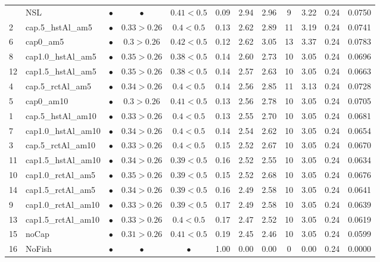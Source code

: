\documentclass[11pt]{book}
\begin{document}
\begin{landscape}
\begin{longtable}[t]{llcccccccccc}
\midrule
\endhead
\
\endfoot
\bottomrule
\endlastfoot
17 & NSL & $\bullet$ & $\bullet$ & $0.41<0.5$ & 0.09 & 2.94 & 2.96 & 9 & 3.22 & 0.24 & 0.0750\\
2 & cap.5\_hstAl\_am5 & $\bullet$ & $0.33>0.26$ & $0.4<0.5$ & 0.13 & 2.62 & 2.89 & 11 & 3.19 & 0.24 & 0.0741\\
6 & cap0\_am5 & $\bullet$ & $0.3>0.26$ & $0.42<0.5$ & 0.12 & 2.62 & 3.05 & 13 & 3.37 & 0.24 & 0.0783\\
8 & cap1.0\_hstAl\_am5 & $\bullet$ & $0.35>0.26$ & $0.38<0.5$ & 0.14 & 2.60 & 2.73 & 10 & 3.05 & 0.24 & 0.0696\\
12 & cap1.5\_hstAl\_am5 & $\bullet$ & $0.35>0.26$ & $0.38<0.5$ & 0.14 & 2.57 & 2.63 & 10 & 3.05 & 0.24 & 0.0663\\
4 & cap.5\_rctAl\_am5 & $\bullet$ & $0.34>0.26$ & $0.4<0.5$ & 0.14 & 2.56 & 2.85 & 11 & 3.13 & 0.24 & 0.0728\\
5 & cap0\_am10 & $\bullet$ & $0.3>0.26$ & $0.41<0.5$ & 0.13 & 2.56 & 2.78 & 10 & 3.05 & 0.24 & 0.0705\\
1 & cap.5\_hstAl\_am10 & $\bullet$ & $0.33>0.26$ & $0.4<0.5$ & 0.13 & 2.55 & 2.70 & 10 & 3.05 & 0.24 & 0.0681\\
7 & cap1.0\_hstAl\_am10 & $\bullet$ & $0.34>0.26$ & $0.4<0.5$ & 0.14 & 2.54 & 2.62 & 10 & 3.05 & 0.24 & 0.0654\\
3 & cap.5\_rctAl\_am10 & $\bullet$ & $0.33>0.26$ & $0.4<0.5$ & 0.15 & 2.52 & 2.67 & 10 & 3.05 & 0.24 & 0.0670\\
11 & cap1.5\_hstAl\_am10 & $\bullet$ & $0.34>0.26$ & $0.39<0.5$ & 0.16 & 2.52 & 2.55 & 10 & 3.05 & 0.24 & 0.0634\\
10 & cap1.0\_rctAl\_am5 & $\bullet$ & $0.35>0.26$ & $0.39<0.5$ & 0.15 & 2.52 & 2.68 & 10 & 3.05 & 0.24 & 0.0676\\
14 & cap1.5\_rctAl\_am5 & $\bullet$ & $0.34>0.26$ & $0.39<0.5$ & 0.16 & 2.49 & 2.58 & 10 & 3.05 & 0.24 & 0.0641\\
9 & cap1.0\_rctAl\_am10 & $\bullet$ & $0.33>0.26$ & $0.39<0.5$ & 0.17 & 2.49 & 2.58 & 10 & 3.05 & 0.24 & 0.0639\\
13 & cap1.5\_rctAl\_am10 & $\bullet$ & $0.33>0.26$ & $0.4<0.5$ & 0.17 & 2.47 & 2.52 & 10 & 3.05 & 0.24 & 0.0619\\
15 & noCap & $\bullet$ & $0.31>0.26$ & $0.41<0.5$ & 0.19 & 2.45 & 2.46 & 10 & 3.05 & 0.24 & 0.0599\\
16 & NoFish & $\bullet$ & $\bullet$ & $\bullet$ & 1.00 & 0.00 & 0.00 & 0 & 0.00 & 0.24 & 0.0000\\*
\end{longtable}
\end{landscape}
\endgroup{}
\end{document}
